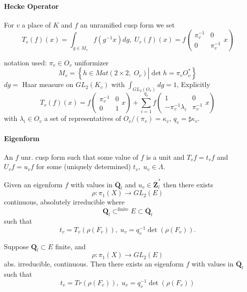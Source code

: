 \paragraph{Hecke Operator} For $v$ a place of $K$ and $f$ an unramified cusp form we set
	$$T_v(f)(x) = \int_{g\in M_v}f(g^{-1}x)dg, \; U_v(f)(x) = f\left(\begin{matrix} \pi_v^{-1} & 0 \\ 0 & \pi_v^{-1}\end{matrix} x\right)$$

\noindent
notation used: $\pi_v\in O_v$ uniformizer
	$$M_v = \left\{h\in Mat(2\times 2, \; O_v)\left| \det h = \pi_vO_v^*\right.\right\}$$
	$dg=$ Haar measure on $GL_2(K_v)$ with $\int_{GL_2(O_v)} dg = 1$, 
	Explicitly
	$$T_v(f)(x) = f\left(\begin{matrix} \pi_v^{-1}& 0 \\ 0 & 1\end{matrix} x\right) + \sum_{i=1}^{q_v} f\left(\begin{matrix} 1 & 0 \\ -\pi_v^{-1}\lambda_i & \pi_v^{-1}\end{matrix} x\right)$$
	with $\lambda_i\in O_v$ a set of representatives of $O_v/(\pi_v)=\kappa_v$, $q_v = \sharp\kappa_v$. 
	
\paragraph{Eigenform} An $f$ unr. cusp form such that some value of $f$ is a unit and $T_vf = t_vf$ and $U_vf = u_vf$ for some (uniquely determined) $t_v, \; u_v\in \Lambda$. 

\begin{theorem}[D'] Given an eigenform $f$ with values in $\overline{\mathbf{Q}}_l$ and $u_v\in \overline{\mathbf{Z}}_l^*$ then there exists
	$$\rho: \pi_1(X)\to GL_2(E)$$
	continuous, absolutely irreducible where
	$$\mathbf{Q}_l\subset^{\text{finite}} E\subset \overline{\mathbf{Q}}_l$$
	such that
	$$t_v = T_v\left(\rho(F_v)\right), \; u_v = q_v^{-1}\det\left(\rho(F_v)\right).$$
\end{theorem}

\begin{theorem}[D'] Suppose $\mathbf{Q}_l\subset E$ finite, and 
	$$\rho: \pi_1(X)\to GL_2(E)$$
	abs. irreducible, continuous. Then there exists an eigenform $f$ with values in $\overline{\mathbf{Q}}_l$ such that 
		$$t_v=Tr\left(\rho(F_v)\right), \; u_v=q_v^{-1}\det(\rho(F_v))$$
\end{theorem}

